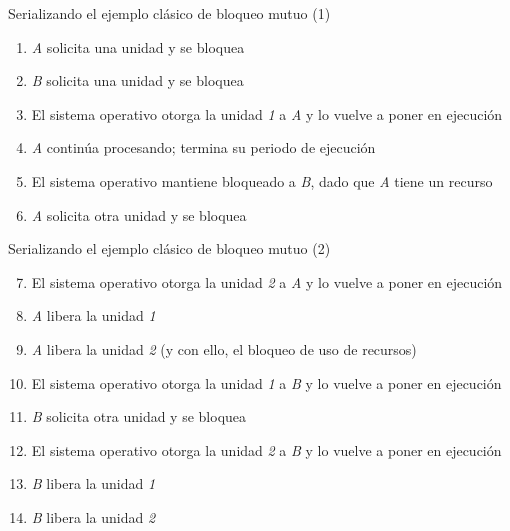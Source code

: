 \documentclass[presentation]{beamer}
\begin{document}
\begin{frame}[label={sec:org77bfb0d}]{Serializando el ejemplo clásico de bloqueo mutuo (1)}
\begin{enumerate}
\item \emph{A} solicita una unidad y se bloquea

\item \emph{B} solicita una unidad y se bloquea

\item El sistema operativo otorga la unidad \emph{1} a \emph{A} y lo vuelve a poner
en ejecución

\item \emph{A} continúa procesando; termina su periodo de ejecución

\item El sistema operativo mantiene bloqueado a \emph{B}, dado que \emph{A} tiene
un recurso

\item \emph{A} solicita otra unidad  y se bloquea
\end{enumerate}
\end{frame}

\begin{frame}[label={sec:orgbd69224}]{Serializando el ejemplo clásico de bloqueo mutuo (2)}
\begin{enumerate}
\setcounter{enumi}{6}
\item El sistema operativo otorga la unidad \emph{2} a \emph{A} y lo vuelve a poner
en ejecución

\item \emph{A} libera la unidad \emph{1}

\item \emph{A} libera la unidad \emph{2} (y con ello, el bloqueo de uso de
recursos)

\item El sistema operativo otorga la unidad \emph{1} a \emph{B} y lo vuelve a
poner en ejecución

\item \emph{B} solicita otra unidad y se bloquea

\item El sistema operativo otorga la unidad \emph{2} a \emph{B} y lo vuelve a
poner en ejecución

\item \emph{B} libera la unidad \emph{1}

\item \emph{B} libera la unidad \emph{2}
\end{enumerate}
\end{frame}
\end{document}
